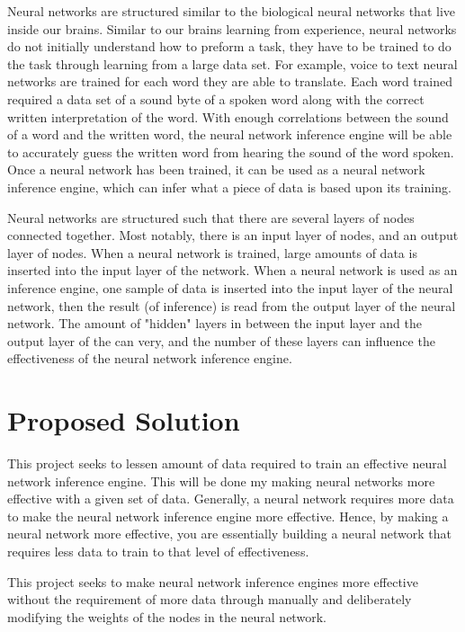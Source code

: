 \documentclass[10pt, draftclsnofoot, onecolumn]{IEEEtran}
\begin{document}
Neural networks are structured similar to the biological neural networks that live inside our brains. Similar to our brains learning from experience, neural networks do not initially understand how to preform a task, they have to be trained to do the task through learning from a large data set. For example, voice to text neural networks are trained for each word they are able to translate. Each word trained required a data set of a sound byte of a spoken word along with the correct written interpretation of the word. With enough correlations between the sound of a word and the written word, the neural network inference engine will be able to accurately guess the written word from hearing the sound of the word spoken. Once a neural network has been trained, it can be used as a neural network inference engine, which can infer what a piece of data is based upon its training.

Neural networks are structured such that there are several layers of nodes connected together. Most notably, there is an input layer of nodes, and an output layer of nodes. When a neural network is trained, large amounts of data is inserted into the input layer of the network. When a neural network is used as an inference engine, one sample of data is inserted into the input layer of the neural network, then the result (of inference) is read from the output layer of the neural network. The amount of "hidden" layers in between the input layer and the output layer of the can very, and the number of these layers can influence the effectiveness of the neural network inference engine.

\section{Proposed Solution}

This project seeks to lessen amount of data required to train an effective neural network inference engine. This will be done my making neural networks more effective with a given set of data. Generally, a neural network requires more data to make the neural network inference engine more effective. Hence, by making a neural network more effective, you are essentially building a neural network that requires less data to train to that level of effectiveness.

This project seeks to make neural network inference engines more effective without the requirement of more data through manually and deliberately modifying the weights of the nodes in the neural network. 
\end{document}
